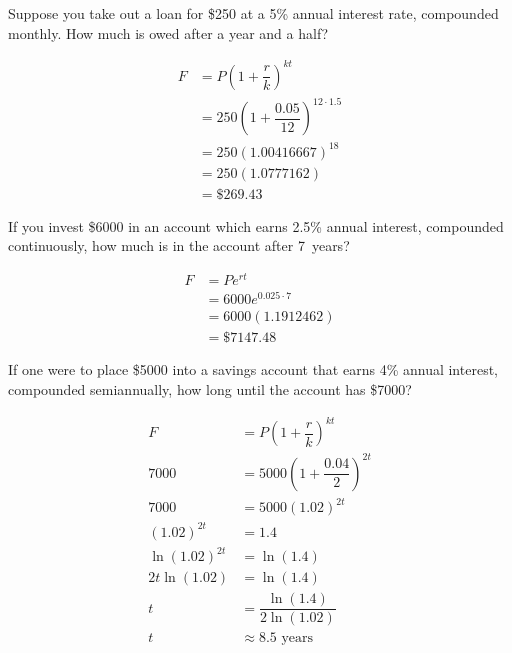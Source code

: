 \documentclass[11pt,letterpaper]{article}
\begin{document}

 Suppose you take out a loan for \$250 at a 5\% annual interest rate, compounded monthly. How much is owed after a year and a half? \pspace

\sol 
	\[
	\begin{aligned}
	F&= P \left(1 + \dfrac{r}{k} \right)^{kt} \\[0.3cm]
	&= 250 \left(1 + \dfrac{0.05}{12} \right)^{12 \cdot 1.5} \\[0.3cm]
	&= 250 (1.00416667)^{18} \\[0.3cm]
	&= 250 (1.0777162) \\[0.3cm]
	&= \$269.43
	\end{aligned}
	\]



\newpage



 If you invest \$6000 in an account which earns 2.5\% annual interest, compounded continuously, how much is in the account after 7~years? \pspace

\sol 
	\[
	\begin{aligned}
	F&= P e^{rt} \\[0.3cm]
	&= 6000 e^{0.025 \cdot 7} \\[0.3cm]
	&= 6000 (1.1912462) \\[0.3cm]
	&= \$7147.48
	\end{aligned}
	\]



\newpage



 If one were to place \$5000 into a savings account that earns 4\% annual interest, compounded semiannually, how long until the account has \$7000? \pspace

\sol 
	\[
	\begin{aligned}
	F&= P \left(1 + \dfrac{r}{k} \right)^{kt} \\[0.3cm]
	7000&= 5000 \left(1 + \dfrac{0.04}{2} \right)^{2t} \\[0.3cm]
	7000&= 5000 (1.02)^{2t} \\[0.3cm]
	(1.02)^{2t}&= 1.4 \\[0.3cm]
	\ln (1.02)^{2t}&= \ln(1.4) \\[0.3cm]
	2t \ln(1.02)&= \ln(1.4) \\[0.3cm]
	t&= \dfrac{\ln(1.4)}{2 \ln(1.02)} \\[0.3cm]
	t&\approx 8.5 \text{ years}
	\end{aligned}
	\]
\end{document}

